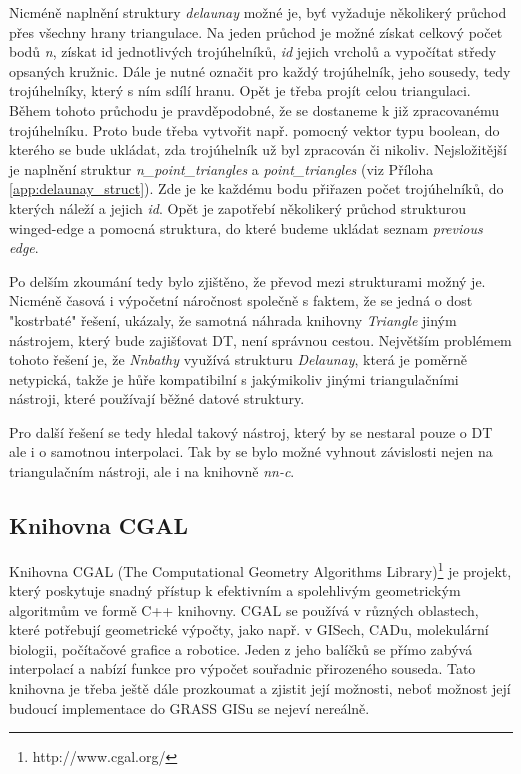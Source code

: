 \documentclass[12pt,a4paper]{article}
\begin{document}
Nicméně naplnění struktury \emph{delaunay} možné je,  byť vyžaduje několikerý průchod přes všechny hrany triangulace. Na jeden průchod je možné získat celkový počet bodů \emph{n}, získat id jednotlivých trojúhelníků, \emph{id} jejich vrcholů a vypočítat středy opsaných kružnic. Dále je nutné označit pro každý trojúhelník, jeho sousedy, tedy trojúhelníky, který s ním sdílí hranu. Opět je třeba projít celou triangulaci. Během tohoto průchodu je pravděpodobné, že se dostaneme k již zpracovanému trojúhelníku. Proto bude třeba vytvořit např. pomocný vektor typu boolean, do kterého se bude ukládat, zda trojúhelník už byl zpracován či nikoliv. Nejsložitější je naplnění struktur \emph{n\_point\_triangles} a \emph{point\_triangles} (viz Příloha \ref{app:delaunay_struct}). Zde je ke každému bodu přiřazen počet trojúhelníků, do kterých náleží a jejich \emph{id}. Opět je zapotřebí několikerý průchod strukturou winged-edge a pomocná struktura, do které budeme ukládat seznam \emph{previous edge}.

Po delším zkoumání tedy bylo zjištěno, že převod mezi strukturami možný je. Nicméně časová i výpočetní náročnost společně s faktem, že se jedná o dost "kostrbaté" řešení, ukázaly, že samotná náhrada knihovny \emph{Triangle} jiným nástrojem, který bude zajišťovat DT, není správnou cestou. Největším problémem tohoto řešení je, že \emph{Nnbathy} využívá strukturu \emph{Delaunay}, která je poměrně netypická, takže je hůře kompatibilní s jakýmikoliv jinými triangulačními nástroji, které používají běžné datové struktury.

Pro další řešení se tedy hledal takový nástroj, který by se nestaral pouze o DT ale i o samotnou interpolaci. Tak by se bylo možné vyhnout závislosti nejen na triangulačním nástroji, ale i na knihovně \emph{nn-c}.

\subsection{Knihovna CGAL}
Knihovna CGAL (The Computational Geometry Algorithms Library)\footnote{http://www.cgal.org/} je projekt, který poskytuje snadný přístup k efektivním a spolehlivým geometrickým algoritmům ve formě C++ knihovny. CGAL se používá v různých oblastech, které potřebují geometrické výpočty, jako např. v GISech, CADu, molekulární biologii, počítačové grafice a robotice. Jeden z jeho balíčků se přímo zabývá interpolací a nabízí funkce pro výpočet souřadnic přirozeného souseda. Tato knihovna je třeba ještě dále prozkoumat a zjistit její možnosti, neboť možnost její budoucí implementace do GRASS GISu se nejeví nereálně.
\end{document}
